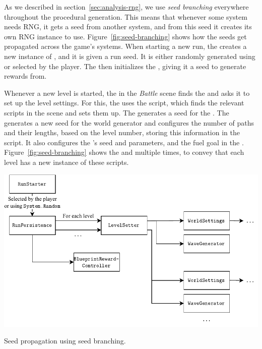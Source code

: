 As we described in section~\ref{sec:analysis-rng}, we use \emph{seed branching} everywhere throughout the procedural generation.
This means that whenever some system needs RNG, it gets a seed from another system, and from this seed it creates its own RNG instance to use.
Figure~\ref{fig:seed-branching} shows how the seeds get propagated across the game's systems.
When starting a new run, the  creates a new instance of , and it is given a run seed.
It is either randomly generated using  or selected by the player.
The  then initializes the , giving it a seed to generate rewards from.

Whenever a new level is started, the  in the \emph{Battle} scene finds the  and asks it to set up the level settings.
For this, the  uses the  script, which finds the relevant scripts in the scene and sets them up.
The  generates a seed for the .
The  generates a new seed for the world generator and configures the number of paths and their lengths, based on the level number, storing this information in the  script.
It also configures the 's seed and parameters, and the fuel goal in the .
Figure~\ref{fig:seed-branching} shows the  and  multiple times, to convey that each level has a new instance of these scripts.

\begin{center}
    \captionsetup{type=figure}
    \includegraphics[width=\textwidth]{img/seed splitting.pdf}
    \caption{Seed propagation using seed branching.}
    \label{fig:seed-branching}
\end{center}

